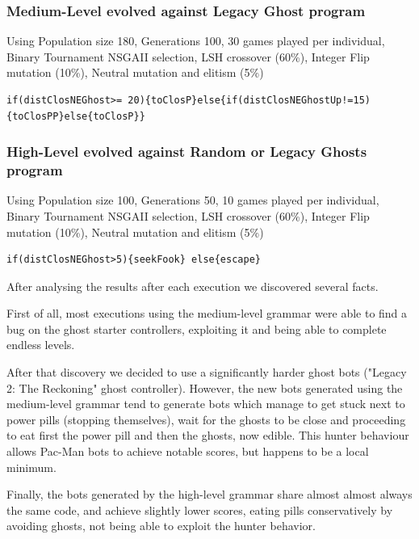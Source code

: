 \documentclass{llncs}
\newcommand{\paco}{Pac-Man }
\begin{document}
\subsubsection{Medium-Level evolved against Legacy Ghost program} Using Population size 180, Generations 100, 30 games played per individual, Binary Tournament NSGAII selection, LSH crossover (60\%), Integer Flip mutation (10\%), Neutral mutation and elitism (5\%)

\begin{lstlisting}[frame=single, caption=caption, breaklines=true]
if(distClosNEGhost>= 20){toClosP}else{if(distClosNEGhostUp!=15){toClosPP}else{toClosP}}
\end{lstlisting} %

\subsubsection{High-Level evolved against Random or Legacy Ghosts program} Using Population size 100, Generations 50, 10 games played per individual, Binary Tournament NSGAII selection, LSH crossover (60\%), Integer Flip mutation (10\%), Neutral mutation and elitism (5\%)

\begin{lstlisting}[frame=single, caption=caption, breaklines=true]
if(distClosNEGhost>5){seekFook} else{escape}
\end{lstlisting} %

After analysing the results after each execution we discovered several facts. 

First of all, most executions using the medium-level grammar were able to find a bug on the ghost starter controllers, exploiting it and being able to complete endless levels.

After that discovery we decided to use a significantly harder ghost bots ("Legacy 2: The Reckoning" ghost controller). However, the new bots generated using the medium-level grammar tend to generate bots which manage to get stuck next to power pills (stopping themselves), wait for the ghosts to be close and proceeding to eat first the power pill and then the ghosts, now edible. This hunter behaviour allows \paco bots to achieve notable scores, but happens to be a local minimum.

Finally, the bots generated by the high-level grammar share almost almost always the same code, and achieve slightly lower scores, eating pills conservatively by avoiding ghosts, not being able to exploit the hunter behavior.
\end{document}
